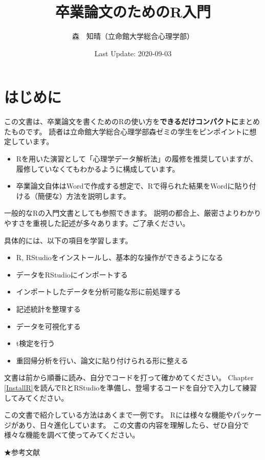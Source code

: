 \documentclass[]{book}
\title{卒業論文のためのR入門}
\author{森　知晴（立命館大学総合心理学部）}
\date{Last Update: 2020-09-03}
\providecommand{\tightlist}{%
  \setlength{\itemsep}{0pt}\setlength{\parskip}{0pt}}
\begin{document}
\maketitle

{
\setcounter{tocdepth}{1}
\tableofcontents
}
\chapter{はじめに}\label{Introduction}

この文書は、卒業論文を書くためのRの使い方を\textbf{できるだけコンパクトに}まとめたものです。
読者は立命館大学総合心理学部森ゼミの学生をピンポイントに想定しています。

\begin{itemize}
\tightlist
\item
  Rを用いた演習として「心理学データ解析法」の履修を推奨していますが、履修していなくてもわかるように構成しています。
\item
  卒業論文自体はWordで作成する想定で、Rで得られた結果をWordに貼り付ける（簡便な）方法を説明します。
\end{itemize}

一般的なRの入門文書としても参照できます。
説明の都合上、厳密さよりわかりやすさを重視した記述が多々あります。ご了承ください。

具体的には、以下の項目を学習します。

\begin{itemize}
\tightlist
\item
  R, RStudioをインストールし、基本的な操作ができるようになる
\item
  データをRStudioにインポートする
\item
  インポートしたデータを分析可能な形に前処理する
\item
  記述統計を整理する
\item
  データを可視化する
\item
  t検定を行う
\item
  重回帰分析を行い、論文に貼り付けられる形に整える
\end{itemize}

文書は前から順番に読み、自分でコードを打って確かめてください。 Chapter
\ref{InstallR}を読んでRとRStudioを準備し、登場するコードを自分で入力して練習してみてください。

この文書で紹介している方法はあくまで一例です。
Rには様々な機能やパッケージがあり、日々進化しています。
この文書の内容を理解したら、ぜひ自分で様々な機能を調べて使ってみてください。

★参考文献
\end{document}
